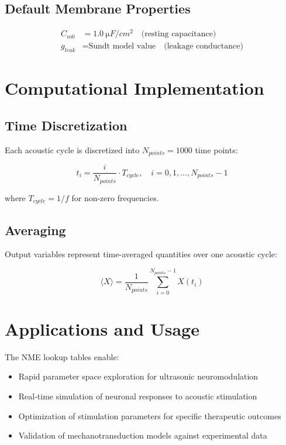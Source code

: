 \documentclass[11pt,a4paper]{article}
\begin{document}
\begin{table}[h!]
\subsection{Default Membrane Properties}
\begin{align}
C_{m0} &= \SI{1.0}{\micro F/cm^2} \quad \text{(resting capacitance)} \\
g_{leak} &= \text{Sundt model value} \quad \text{(leakage conductance)}
\end{align}

\section{Computational Implementation}

\subsection{Time Discretization}

Each acoustic cycle is discretized into $N_{points} = 1000$ time points:

\begin{equation}
t_i = \frac{i}{N_{points}} \cdot T_{cycle}, \quad i = 0, 1, \ldots, N_{points}-1
\end{equation}

where $T_{cycle} = 1/f$ for non-zero frequencies.

\subsection{Averaging}

Output variables represent time-averaged quantities over one acoustic cycle:

\begin{equation}
\langle X \rangle = \frac{1}{N_{points}} \sum_{i=0}^{N_{points}-1} X(t_i)
\end{equation}

\section{Applications and Usage}

The NME lookup tables enable:
\begin{itemize}
    \item Rapid parameter space exploration for ultrasonic neuromodulation
    \item Real-time simulation of neuronal responses to acoustic stimulation
    \item Optimization of stimulation parameters for specific therapeutic outcomes
    \item Validation of mechanotransduction models against experimental data
\end{itemize}


\end{table}
\end{document}
